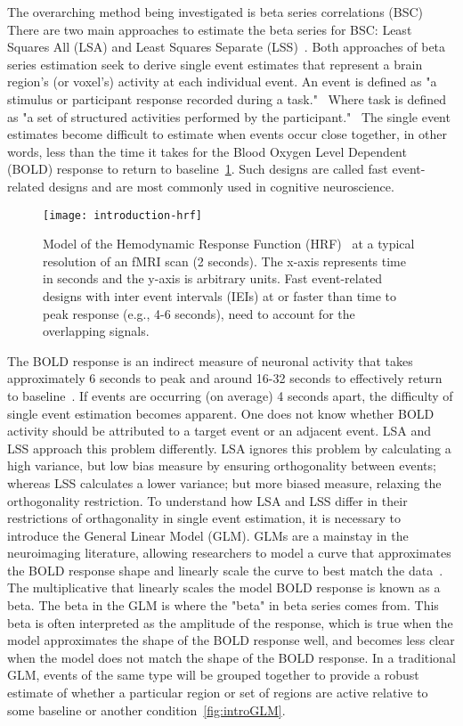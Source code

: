 \documentclass[10pt,letterpaper]{article}
\begin{document}
The overarching method being investigated is beta series correlations (BSC)~\cite{Rissman2004,Mumford2012,Turner2012a,Abdulrahman2016}
There are two main approaches to estimate the beta series for BSC: Least Squares All (LSA) and Least Squares Separate (LSS)~\cite{Mumford2012}.
Both approaches of beta series estimation seek to derive single event estimates that represent a brain region's
(or voxel's) activity at each individual event.
An event is defined as "a stimulus or participant response recorded during a task."~\cite{Gorgolewski2016}
Where task is defined as "a set of structured activities performed by the participant."~\cite{Gorgolewski2016}
The single event estimates become difficult to estimate when events occur close together,
in other words, less than the time it takes for the Blood Oxygen Level Dependent (BOLD) response to return to baseline~\ref{fig:introhrf}.
Such designs are called fast event-related designs and are most commonly
used in cognitive neuroscience.

\begin{figure}[H]
  \centering
  \texttt{[image: introduction-hrf]}
  \caption{
    Model of the Hemodynamic Response Function (HRF)~\cite{Glover1999} at a
    typical resolution of an fMRI scan (2 seconds).
    The x-axis represents time in seconds and the y-axis is arbitrary units.
    Fast event-related designs with inter event intervals (IEIs) at or faster than time to peak
    response (e.g., 4-6 seconds), need to account for the overlapping signals.
  }
  \label{fig:introhrf}
\end{figure}

The BOLD response is an indirect measure of neuronal activity that takes approximately 6 seconds to
peak and around 16-32 seconds to effectively return to baseline~\cite{Glover1999}.
If events are occurring (on average) 4 seconds apart, the difficulty of single event estimation
becomes apparent.
One does not know whether BOLD activity should be attributed to a target event or an
adjacent event.
LSA and LSS approach this problem differently.
LSA ignores this problem by calculating a high variance, but low bias measure by ensuring orthogonality
between events;
whereas LSS calculates a lower variance; but more biased measure, relaxing the orthogonality restriction.
To understand how LSA and LSS differ in their restrictions of orthagonality in single event estimation,
it is necessary to introduce the General Linear Model (GLM).
GLMs are a mainstay in the neuroimaging literature, allowing researchers to model
a curve that approximates the BOLD response shape and linearly scale the curve
to best match the data~\cite{Friston1995}.
The multiplicative that linearly scales the model BOLD response is known as a beta.
The beta in the GLM is where the "beta" in beta series comes from.
This beta is often interpreted as the amplitude of the response, which is true when the
model approximates the shape of the BOLD response well, and becomes less clear when
the model does not match the shape of the BOLD response.
In a traditional GLM, events of the same type will be grouped together
to provide a robust estimate of whether a particular region or set of regions are
active relative to some baseline or another condition~\ref{fig:introGLM}.
\end{document}
